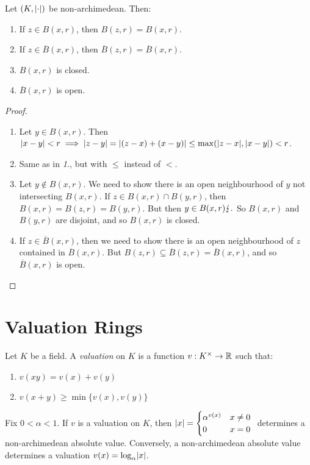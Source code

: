 \documentclass[10pt,a4paper]{article}
\begin{document}
\begin{lemma}
  Let $(K, \lvert\cdot\rvert)$ be non-archimedean. Then:
  \begin{enumerate}
    \item If $z \in B(x, r)$, then $B(z, r) = B(x, r)$.
    \item If $z \in \overline{B}(x, r)$, then $\overline{B}(z, r) = \overline{B}(x, r)$.
    \item $B(x, r)$ is closed.
    \item $\overline{B}(x, r)$ is open.
  \end{enumerate}
\end{lemma}
\begin{proof}\hspace*{0cm}
  \begin{enumerate}[label=\textit{\arabic*.}]
    \item Let $y \in B(x, r)$. Then $\lvert x-y\rvert < r \implies \lvert z-y\rvert = \lvert(z-x) + (x-y)\rvert \leq \max(\lvert z-x\rvert, \lvert x-y\rvert) < r$.
    \item Same as in \textit{1.}, but with $\leq$ instead of $<$.
    \item Let $y \notin B(x, r)$. We need to show there is an open neighbourhood of $y$ not intersecting $B(x, r)$. If $z \in B(x, r) \cap B(y, r)$, then $B(x, r) = B(z, r) = B(y, r)$. But then $y \in B(x, r) \lightning.$ So $B(x, r)$ and $B(y, r)$ are disjoint, and so $B(x, r)$ is closed.
    \item If $z \in \overline{B}(x, r)$, then we need to show there is an open neighbourhood of $z$ contained in $\overline{B}(x, r)$. But $B(z, r) \subseteq \overline{B}(z, r) = \overline{B}(x, r)$, and so $\overline{B}(x, r)$ is open.
  \end{enumerate}
\end{proof}

\section{Valuation Rings}
\begin{definition}
  Let $K$ be a field. A \emph{valuation} on $K$ is a function $v: K^\times \to \mathbb{R}$ such that:
  \begin{enumerate}
    \item $v(xy) = v(x) + v(y)$
    \item $v(x+y) \geq \min\{v(x), v(y)\}$
  \end{enumerate}
\end{definition}
Fix $0 <\alpha<1$. If $v$ is a valuation on $K$, then $\lvert x\rvert = \begin{cases} \alpha^{v(x)} & x \neq 0 \\ 0 & x = 0\end{cases}\;$ determines a non-archimedean absolute value. Conversely, a non-archimedean absolute value determines a valuation $v(x) = \log_\alpha \lvert x\rvert$.
\end{document}
